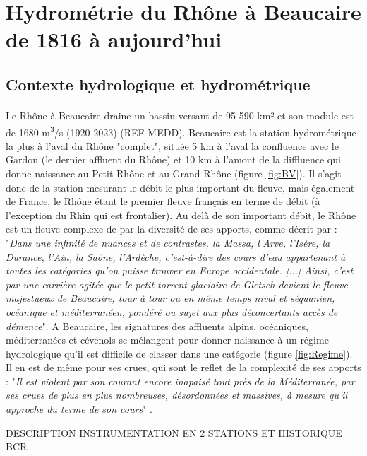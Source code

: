 \documentclass[11pt]{article}
\begin{document}
\section{Hydrométrie du Rhône à Beaucaire de 1816 à aujourd'hui}

	\subsection{Contexte hydrologique et hydrométrique}
	
	\paragraph{} Le Rhône à Beaucaire draine un bassin versant de 95 590 km² et son module est de 1680 m\textsuperscript{3}/s (1920-2023) (REF MEDD). Beaucaire est la station hydrométrique la plus à l'aval du Rhône "complet", située 5 km à l'aval la confluence avec le Gardon (le dernier affluent du Rhône) et 10 km à l'amont de la diffluence qui donne naissance au Petit-Rhône et au Grand-Rhône (figure \ref{fig:BV}). Il s'agit donc de la station mesurant le débit le plus important du fleuve, mais également de France, le Rhône étant le premier fleuve français en terme de débit (à l'exception du Rhin qui est frontalier). Au delà de son important débit, le Rhône est un fleuve complexe de par la diversité de ses apports, comme décrit par \citet{parde_regime_1925} : "\textit{Dans une infinité de nuances et de contrastes, la Massa, l'Arve, l'Isère, la Durance, l'Ain, la Saône, l'Ardèche, c'est-à-dire des cours d'eau appartenant à toutes les catégories qu'on puisse trouver en Europe occidentale. [...] Ainsi, c'est par une carrière agitée que le petit torrent glaciaire de Gletsch devient le fleuve majestueux de Beaucaire, tour à tour ou en même temps nival et séquanien, océanique et méditerranéen, pondéré ou sujet aux plus déconcertants accès de démence}". A Beaucaire, les signatures des affluents alpins, océaniques, méditerranées et cévenols se mélangent pour donner naissance à un régime hydrologique qu'il est difficile de classer dans une catégorie (figure \ref{fig:Regime}). Il en est de même pour ses crues, qui sont le reflet de la complexité de ses apports : "\textit{Il est violent par son courant encore inapaisé tout près de la Méditerranée, par ses crues de plus en plus nombreuses, désordonnées et massives, à mesure qu'il approche du terme de son cours}" \citep{parde_regime_1925}. 


DESCRIPTION INSTRUMENTATION EN 2 STATIONS ET HISTORIQUE BCR
\end{document}

